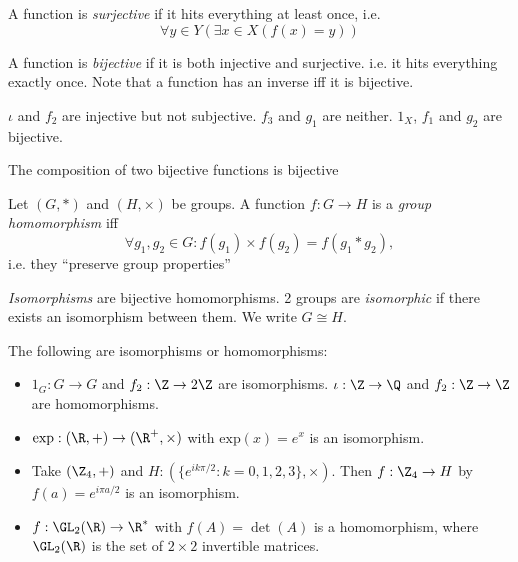 \documentclass[a4paper]{article}
\begin{document}
  \begin{defi}
    A function is \emph{surjective} if it hits everything at least once, i.e. 
    \[
      \forall y\in Y(\exists x\in X(f(x) = y))
    \]
  \end{defi}

  \begin{defi}
    A function is \emph{bijective} if it is both injective and surjective. i.e. it hits everything exactly once. Note that a function has an inverse iff it is bijective.
  \end{defi}

  \begin{eg}
    $\iota$ and $f_2$ are injective but not subjective. $f_3$ and $g_1$ are neither. $1_X$, $f_1$ and $g_2$ are bijective.
  \end{eg}

  \begin{lemma}
    The composition of two bijective functions is bijective
  \end{lemma}

  \begin{defi}
    Let $(G, *)$ and $(H, \times)$ be groups. A function $f:G\rightarrow H$ is a \emph{group homomorphism} iff
    \[
      \forall g_1, g_2 \in G: f(g_1)\times f(g_2) = f(g_1 * g_2),
    \]
    i.e. they ``preserve group properties''
  \end{defi}

  \begin{defi}
    \emph{Isomorphisms} are bijective homomorphisms. 2 groups are \emph{isomorphic} if there exists an isomorphism between them. We write $G\cong H$.
  \end{defi}

  \begin{eg}
    The following are isomorphisms or homomorphisms:
    \begin{itemize}
      \item $1_G: G \rightarrow G$ and $f_2: \Z \rightarrow 2\Z$  are isomorphisms. $\iota: \Z\rightarrow\Q$ and $f_2:\Z\rightarrow\Z$ are homomorphisms.
      \item $\mathrm{exp}: (\R, +) \rightarrow (\R^+, \times)$ with $\mathrm{exp}(x) = e^x$ is an isomorphism.
      \item Take $(\Z_4, +)$ and $H: (\{e^{ik\pi/2}:k=0, 1 ,2, 3\}, \times)$. Then $f: \Z_4 \rightarrow H$  by $f(a) = e^{i\pi a/2}$ is an isomorphism.
      \item $f: \GL_2(\R) \rightarrow \R^*$ with $f(A) = \det(A)$ is a homomorphism, where $\GL_2(\R)$ is the set of $2\times 2$ invertible matrices.
    \end{itemize}
  \end{eg}
\end{document}
